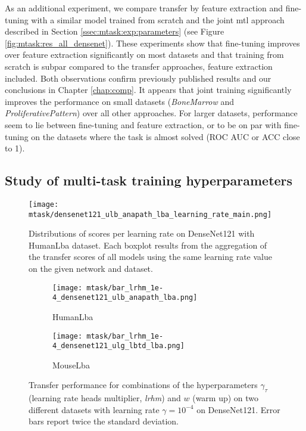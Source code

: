 As an additional experiment, we compare transfer by feature extraction and fine-tuning with a similar model trained from scratch and the joint \acrshort{mtl} approach described in Section \ref{ssec:mtask:exp:parameters} (see Figure \ref{fig:mtask:res_all_densenet}). These experiments show that fine-tuning improves over feature extraction significantly on most datasets and that training from scratch is subpar compared to the transfer approaches, feature extraction included. Both observations confirm previously published results \parencite{ponzio2019dealing, tajbakhsh2016convolutional,shin2016deep} and our conclusions in Chapter \ref{chap:comp}. It appears that joint training significantly improves the performance on small datasets (\textit{BoneMarrow} and \textit{ProliferativePattern}) over all other approaches. For larger datasets, performance seem to lie between fine-tuning and feature extraction, or to be on par with fine-tuning on the datasets where the task is almost solved (ROC AUC or ACC close to 1). 

\subsection{Study of multi-task training hyperparameters}
\label{ssec:mtask:hyperparameters}

\begin{figure}[t]
    \centering
    \texttt{[image: mtask/densenet121\_ulb\_anapath\_lba\_learning\_rate\_main.png]}
    \caption{Distributions of scores per learning rate on DenseNet121 with HumanLba dataset. Each boxplot results from the aggregation of the transfer scores of all models using the same learning rate value on the given network and dataset.}
    \label{fig:mtask:lr_effect}
\end{figure}

\begin{figure}[t]
    \centering
    \begin{subfigure}[t]{0.70\textwidth}
        \centering
        \texttt{[image: mtask/bar\_lrhm\_1e-4\_densenet121\_ulb\_anapath\_lba.png]}
        \caption{HumanLba}
    \end{subfigure}    
    \begin{subfigure}[t]{0.70\textwidth}
        \centering
        \texttt{[image: mtask/bar\_lrhm\_1e-4\_densenet121\_ulg\_lbtd\_lba.png]}
        \caption{MouseLba}
    \end{subfigure}    
    \caption{Transfer performance for combinations of the hyperparameters $\gamma_\tau$ (learning rate heads multiplier, \textit{lrhm}) and $w$ (warm up) on two different datasets with learning rate $\gamma = 10^{-4}$ on DenseNet121. Error bars report twice the standard deviation.}
    \label{fig:mtask:hyper_other_effect}
\end{figure}

